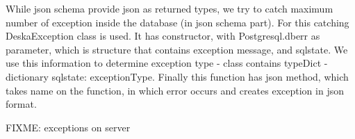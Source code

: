 \documentclass[deska]{subfiles}
\begin{document}
While json schema provide json as returned types, we try to catch maximum number of exception inside the database (in
json schema part).
For this catching DeskaException class is used. It has constructor, with Postgresql.dberr as parameter, which is structure that contains exception
message, and sqlstate. We use this information to determine exception type - class contains typeDict - dictionary {sqlstate: exceptionType}.
Finally this function has json method, which takes name on the function, in which error occurs and creates exception in json format.

FIXME: exceptions on server
\end{document}

